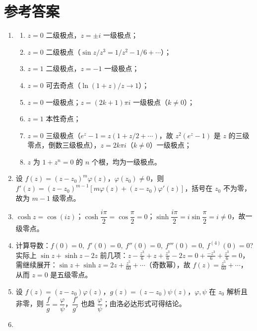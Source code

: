 \section{参考答案}\label{ux53c2ux8003ux7b54ux6848-4}

\begin{enumerate}
\def\labelenumi{\arabic{enumi}.}
\item
  \begin{enumerate}
  \def\labelenumii{(\arabic{enumii})}
  \tightlist
  \item
    \(z=0\) 二级极点，\(z=\pm i\) 一级极点；
  \item
    \(z=0\) 二级极点（\(\sin z/z^3=1/z^2-1/6+\cdots\)）；
  \item
    \(z=1\) 二级极点，\(z=-1\) 一级极点；
  \item
    \(z=0\) 可去奇点（\(\ln(1+z)/z\to1\)）；
  \item
    \(z=0\) 一级极点；\(z=(2k+1)\pi i\) 一级极点（\(k\neq0\)）；
  \item
    \(z=1\) 本性奇点；
  \item
    \(z=0\) 三级极点（\(e^z-1=z(1+z/2+\cdots)\)，故 \(z^2(e^z-1)\) 是
    \(z\)
    的三级零点，倒数三级极点），\(z=2k\pi i\)（\(k\neq0\)）一级极点；
  \item
    \(z\) 为 \(1+z^n=0\) 的 \(n\) 个根，均为一级极点。
  \end{enumerate}
\item
  设 \(f(z)=(z-z_0)^m\varphi(z)\)，\(\varphi(z_0)\neq0\)，则
  \(f'(z)=(z-z_0)^{m-1}[m\varphi(z)+(z-z_0)\varphi'(z)]\)，括号在
  \(z_0\) 不为零，故为 \(m-1\) 级零点。
\item
  \(\cosh z=\cos(iz)\)；\(\cosh\dfrac{i\pi}{2}=\cos\dfrac{\pi}{2}=0\)；\(\sinh\dfrac{i\pi}{2}=i\sin\dfrac{\pi}{2}=i\neq0\)，故一级零点。
\item
  计算导数：\(f(0)=0,\ f'(0)=0,\ f''(0)=0,\ f'''(0)=0,\ f^{(4)}(0)=0\)?
  实际上 \(\sin z+\sinh z-2z\)
  前几项：\(z-\frac{z^3}{6}+z+\frac{z^3}{6}-2z=0+\frac{-z^3}{6}+\frac{z^3}{6}=0\)，需继续展开：\(\sin z+\sinh z=2z+\frac{z^5}{60}+\cdots\)（奇数幂），故
  \(f(z)=\frac{z^5}{60}+\cdots\)，从而 \(z=0\) 是五级零点。
\item
  设
  \(f(z)=(z-z_0)\varphi(z)\)，\(g(z)=(z-z_0)\psi(z)\)，\(\varphi,\psi\)
  在 \(z_0\) 解析且非零，则
  \(\dfrac{f}{g}=\dfrac{\varphi}{\psi}\)，\(\dfrac{f'}{g'}\) 也趋
  \(\dfrac{\varphi}{\psi}\)；由洛必达形式可得结论。
\item
  \begin{enumerate}
  \def\labelenumii{(\arabic{enumii})}
  \tightlist

\end{enumerate}
\end{enumerate}
